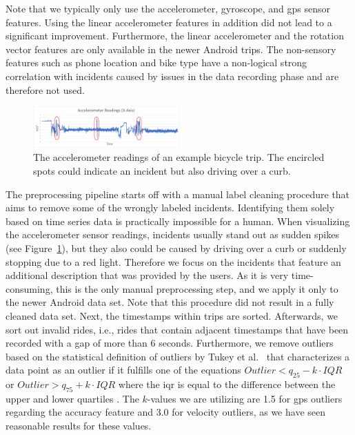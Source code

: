 Note that we typically only use the accelerometer, gyroscope, and \ac{gps} sensor features.
Using the linear accelerometer features in addition did not lead to a significant improvement.
Furthermore, the linear accelerometer and the rotation vector features are only available in the newer Android trips.
The non-sensory features such as phone location and bike type have a non-logical strong correlation with incidents caused by issues in the data recording phase and are therefore not used.

\begin{figure}[t]
	\centering
	\includegraphics[width=0.5\textwidth]{fig/accelerometer-x-axis.png}
	\caption{The accelerometer readings of an example bicycle trip. The encircled spots could indicate an incident but also driving over a curb.}
	\label{fig:x-axis}
\end{figure}

The preprocessing pipeline starts off with a manual label cleaning procedure that aims to remove some of the wrongly labeled incidents.
Identifying them solely based on time series data is practically impossible for a human.
When visualizing the accelerometer sensor readings, incidents usually stand out as sudden spikes (see Figure~\ref{fig:x-axis}), but they also could be caused by driving over a curb or suddenly stopping due to a red light.
Therefore we focus on the incidents that feature an additional description that was provided by the users.
As it is very time-consuming, this is the only manual preprocessing step, and we apply it only to the newer Android data set.
Note that this procedure did not result in a fully cleaned data set.
Next, the timestamps within trips are sorted.
Afterwards, we sort out invalid rides, i.e., rides that contain adjacent timestamps that have been recorded with a gap of more than 6 seconds.
Furthermore, we remove outliers based on the statistical definition of outliers by Tukey et al.~\cite{tukey1977exploratory} that characterizes a data point as an outlier if it fulfills one of the equations $Outlier < q_{25} - k \cdot IQR$ or $Outlier > q_{75} + k \cdot IQR$ where the \ac{iqr} is equal to the difference between the upper and lower quartiles \cite{upton1996understanding, zwillinger1999crc}.
The $k$-values we are utilizing are 1.5 for \ac{gps} outliers regarding the accuracy feature and 3.0 for velocity outliers, as we have seen reasonable results for these values.

